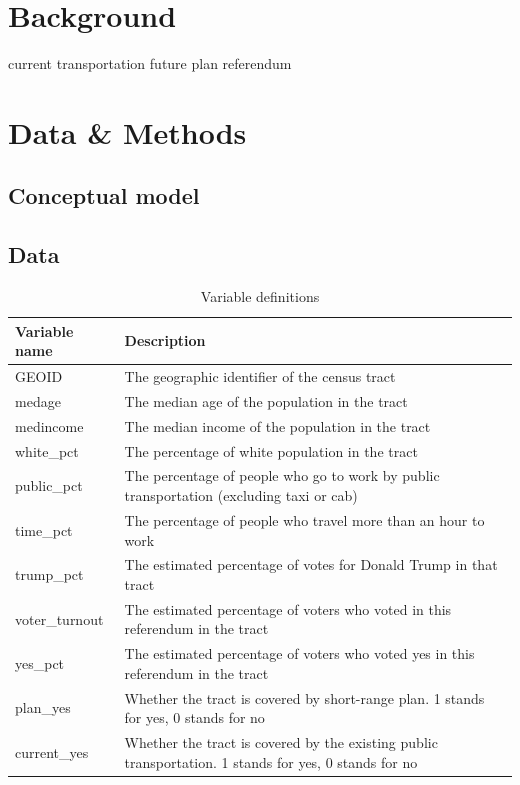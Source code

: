\documentclass[
]{article}
\begin{document}
\hypertarget{background}{%
\section{Background}\label{background}}

current transportation future plan referendum

\hypertarget{data-methods}{%
\section{Data \& Methods}\label{data-methods}}

\hypertarget{conceptual-model}{%
\subsection{Conceptual model}\label{conceptual-model}}

\hypertarget{data}{%
\subsection{Data}\label{data}}

\begin{table}
\centering
\caption{Variable definitions}
\label{variableDefinitions}
\begin{tabular}{ll}
\hline
\hline
Variable name      & Description                                   \\
\hline
GEOID          & The geographic identifier of the census tract                 \\
medage        & The median age of the population in the tract               \\
medincome        & The median income of the population in the tract               \\
white\_pct           & The percentage of white population in the tract      \\
public\_pct          & The percentage of people who go to work by public transportation (excluding taxi or cab)      \\
time\_pct           & The percentage of people who travel more than an hour to work      \\
trump\_pct          & The estimated percentage of votes for Donald Trump in that tract      \\
voter\_turnout  & The estimated percentage of voters who voted in this referendum in the tract \\
yes\_pct           & The estimated percentage of voters who voted yes in this referendum in the tract      \\
plan\_yes          & Whether the tract is covered by short-range plan. 1 stands for yes, 0 stands for no      \\
current\_yes          & Whether the tract is covered by the existing public transportation. 1 stands for yes, 0 stands for no      \\
\hline
\end{tabular}
\end{table}
\end{document}
